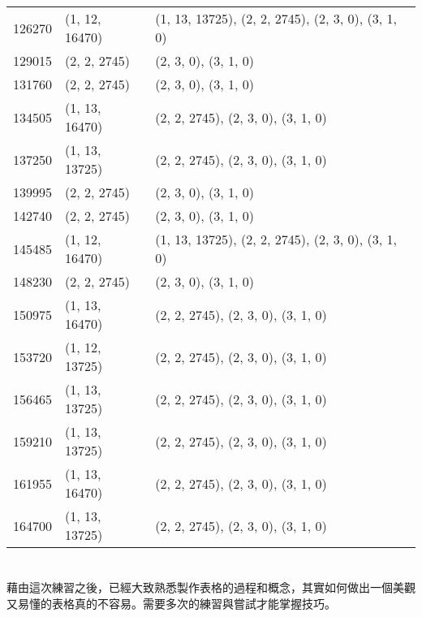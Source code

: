 \begin{center}
\begin{longtable}{|l|l|l|}
126270 & (1, 12, 16470) & (1, 13, 13725), (2, 2, 2745), (2, 3, 0), (3, 1, 0) \\
129015 & (2, 2, 2745) & (2, 3, 0), (3, 1, 0) \\
131760 & (2, 2, 2745) & (2, 3, 0), (3, 1, 0) \\
134505 & (1, 13, 16470) & (2, 2, 2745), (2, 3, 0), (3, 1, 0) \\
137250 & (1, 13, 13725) & (2, 2, 2745), (2, 3, 0), (3, 1, 0) \\
139995 & (2, 2, 2745) & (2, 3, 0), (3, 1, 0) \\
142740 & (2, 2, 2745) & (2, 3, 0), (3, 1, 0) \\
145485 & (1, 12, 16470) & (1, 13, 13725), (2, 2, 2745), (2, 3, 0), (3, 1, 0) \\
148230 & (2, 2, 2745) & (2, 3, 0), (3, 1, 0) \\
150975 & (1, 13, 16470) & (2, 2, 2745), (2, 3, 0), (3, 1, 0) \\
153720 & (1, 12, 13725) & (2, 2, 2745), (2, 3, 0), (3, 1, 0) \\
156465 & (1, 13, 13725) & (2, 2, 2745), (2, 3, 0), (3, 1, 0) \\
159210 & (1, 13, 13725) & (2, 2, 2745), (2, 3, 0), (3, 1, 0) \\
161955 & (1, 13, 16470) & (2, 2, 2745), (2, 3, 0), (3, 1, 0) \\
164700 & (1, 13, 13725) & (2, 2, 2745), (2, 3, 0), (3, 1, 0) \\
\end{longtable}
\end{center}
\section*{}
藉由這次練習之後，已經大致熟悉製作表格的過程和概念，其實如何做出一個美觀又易懂的表格真的不容易。需要多次的練習與嘗試才能掌握技巧。

%